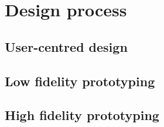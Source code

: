 \section{Design process}\label{sec:design-process}


\subsection{User-centred design}\label{subsec:user-centred-design}


\cite{lu2011pubmed, hearst2007biotext}



\cite{bolchini2009better, pavelin2012bioinformatics}


\subsection{Low fidelity prototyping}\label{subsec:low-fidelity-prototype}

\cite{egger2000lofi}



\subsection{High fidelity prototyping}\label{subsec:high-fidelity-prototype}


